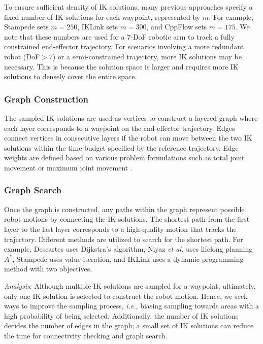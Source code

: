 To ensure sufficient density of IK solutions, many previous approaches specify a fixed number of IK solutions for each waypoint, represented by $m$. For example, Stampede \cite{rakita2019stampede} sets $m{=}250$, IKLink \cite{wang2024iklink} sets $m{=}300$, and CppFlow \cite{morgan2024cppflow} sets $m{=}175$. We note that these numbers are used for a 7-DoF robotic arm to track a fully constrained end-effector trajectory. For scenarios involving a more redundant robot (DoF$>$7) or a semi-constrained trajectory, more IK solutions may be necessary. This is because the solution space is larger and requires more IK solutions to densely cover the entire space. 
    

\subsubsection{Graph Construction} \label{sec:conventional_graph}
The sampled IK solutions are used as vertices to construct a layered graph where each layer corresponds to a waypoint on the end-effector trajectory. Edges connect vertices in consecutive layers if the robot can move between the two IK solutions within the time budget specified by the reference trajectory. Edge weights are defined based on various problem formulations such as total joint movement \cite{rakita2019stampede} or maximum joint movement \cite{morgan2024cppflow}.


\subsubsection{Graph Search} \label{sec:conventional_search}
Once the graph is constructed, any paths within the graph represent possible robot motions by connecting the IK solutions. The shortest path from the first layer to the last layer corresponds to a high-quality motion that tracks the trajectory. Different methods are utilized to search for the shortest path. For example, Descartes \cite{Descartes} uses Dijkstra's algorithm, Niyaz \textit{et al.} \cite{niyaz2020following} uses lifelong planning $A^*$, Stampede \cite{rakita2019stampede} uses value iteration, and IKLink \cite{wang2024iklink} uses a dynamic programming method with two objectives.


\textit{Analysis}:
Although multiple IK solutions are sampled for a waypoint, ultimately, only one IK solution is selected to construct the robot motion. Hence, we seek ways to improve the sampling process, \textit{i.e.}, biasing sampling towards areas with a high probability of being selected. Additionally, the number of IK solutions decides the number of edges in the graph; a small set of IK solutions can reduce the time for connectivity checking and graph search.

